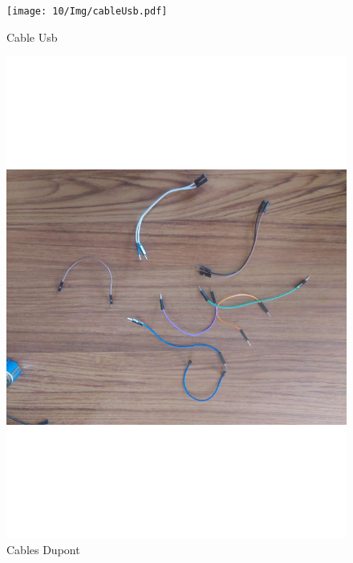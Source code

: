 \begin{figure}[H]
        \centering
        \texttt{[image: 10/Img/cableUsb.pdf]}
        \caption{Cable Usb}
        \label{Cable usbl}
    \end{figure}
    
    \begin{figure}[H]
        \centering
        \includegraphics[trim = {30mm 30mm 30mm 30mm},clip,scale=0.2]{10/Img/cablesDupont.pdf}
        \caption{Cables Dupont}
        \label{Cables Dupont}
    \end{figure}
    

